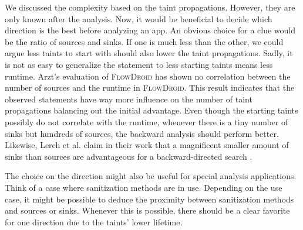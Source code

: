 \documentclass[../draft.tex]{subfiles}
\begin{document}
    We discussed the complexity based on the taint propagations. 
    However, they are only known after the analysis. 
    Now, it would be beneficial to decide which direction is the best before analyzing an app. 
    An obvious choice for a clue would be the ratio of sources and sinks. 
    If one is much less than the other, we could argue less taints to start with should also lower the taint propagations. 
    Sadly, it is not as easy to generalize the statement to less starting taints means less runtime. 
    Arzt's evaluation of \textsc{FlowDroid} has shown no correlation between the number of sources and the runtime in \textsc{FlowDroid}\cite{Arzt2017PhD}. 
    This result indicates that the observed statements have way more influence on the number of taint propagations balancing out the initial advantage.
    Even though the starting taints possibly do not correlate with the runtime, whenever there is a tiny number of sinks but hundreds of sources, the backward analysis should perform better.
    Likewise, Lerch et al. claim in their work that a magnificent smaller amount of sinks than sources are advantageous for a backward-directed search \cite{Lerch2014}.

    The choice on the direction might also be useful for special analysis applications.
    Think of a case where sanitization methods\footnotemark{} are in use.
    Depending on the use case, it might be possible to deduce the proximity between sanitization methods and sources or sinks.
    Whenever this is possible, there should be a clear favorite for one direction due to the taints' lower lifetime.

\end{document}
